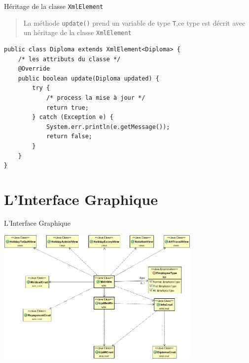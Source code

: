 \documentclass[captions=tableheading]{beamer}
\begin{document}
\begin{frame}[fragile,label={sec:orgf76f778}]{Héritage de la classe \texttt{XmlElement}}
 \begin{quote}
La méthode \texttt{update()} prend un variable de type \texttt{T},\pause ce type est décrit avec un héritage de la classe \texttt{XmlElement} \pause
\end{quote}

\begin{verbatim}
public class Diploma extends XmlElement<Diploma> {
    /* les attributs du classe */
    @Override
    public boolean update(Diploma updated) {
        try {
            /* process la mise à jour */
            return true;
        } catch (Exception e) {
            System.err.println(e.getMessage());
            return false;
        }
    }
}
\end{verbatim}
\end{frame}
\section{L’Interface Graphique}
\label{sec:org877219e}
\begin{frame}[label={sec:org9d855c3}]{L’Interface Graphique}
\begin{center}
\includegraphics[width=10cm]{./diags/OverviewOnWinsAnd.png}
\end{center}
\end{frame}
\end{document}
